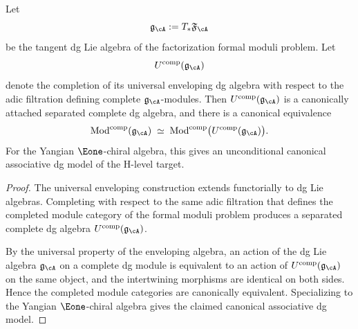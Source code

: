 \begin{proposition}
\label{prop:yangian-canonical-envelope}
Let
\[
\mathfrak{g}_{\cA}:=T_*\mathfrak{F}_{\cA}
\]
be the tangent dg Lie algebra of the factorization formal moduli
problem.  Let
\[
U^{\mathrm{comp}}(\mathfrak{g}_{\cA})
\]
denote the completion of its universal enveloping dg algebra with
respect to the adic filtration defining complete
$\mathfrak{g}_{\cA}$-modules.  Then
$U^{\mathrm{comp}}(\mathfrak{g}_{\cA})$ is a canonically attached
separated complete dg algebra, and there is a canonical equivalence
\[
\operatorname{Mod}^{\mathrm{comp}}(\mathfrak{g}_{\cA})
\;\simeq\;
\operatorname{Mod}^{\mathrm{comp}}\bigl(
  U^{\mathrm{comp}}(\mathfrak{g}_{\cA})
\bigr).
\]
For the Yangian $\Eone$-chiral algebra, this gives an unconditional
canonical associative dg model of the H-level target.
\end{proposition}

\begin{proof}
The universal enveloping construction extends functorially to dg Lie
algebras.  Completing with respect to the same adic filtration that
defines the completed module category of the formal moduli problem
produces a separated complete dg algebra
$U^{\mathrm{comp}}(\mathfrak{g}_{\cA})$.

By the universal property of the enveloping algebra, an action of the
dg Lie algebra $\mathfrak{g}_{\cA}$ on a complete dg module is
equivalent to an action of
$U^{\mathrm{comp}}(\mathfrak{g}_{\cA})$ on the same object, and the
intertwining morphisms are identical on both sides.  Hence the
completed module categories are canonically equivalent.  Specializing
to the Yangian $\Eone$-chiral algebra gives the claimed canonical
associative dg model.
\end{proof}

